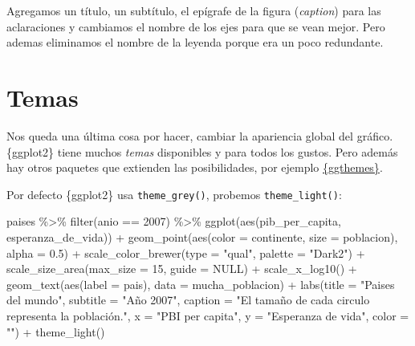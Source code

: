 \documentclass[
  openany]{book}
\newenvironment{Shaded}{\begin{snugshade}}{\end{snugshade}}
\newcommand{\AttributeTok}[1]{\textcolor[rgb]{0.77,0.63,0.00}{#1}}
\newcommand{\ConstantTok}[1]{\textcolor[rgb]{0.00,0.00,0.00}{#1}}
\newcommand{\DecValTok}[1]{\textcolor[rgb]{0.00,0.00,0.81}{#1}}
\newcommand{\FloatTok}[1]{\textcolor[rgb]{0.00,0.00,0.81}{#1}}
\newcommand{\FunctionTok}[1]{\textcolor[rgb]{0.00,0.00,0.00}{#1}}
\newcommand{\NormalTok}[1]{#1}
\newcommand{\SpecialCharTok}[1]{\textcolor[rgb]{0.00,0.00,0.00}{#1}}
\newcommand{\StringTok}[1]{\textcolor[rgb]{0.31,0.60,0.02}{#1}}
\begin{document}
Agregamos un título, un subtítulo, el epígrafe de la figura (\emph{caption}) para las aclaraciones y cambiamos el nombre de los ejes para que se vean mejor.
Pero ademas eliminamos el nombre de la leyenda porque era un poco redundante.

\hypertarget{temas}{%
\section{Temas}\label{temas}}

Nos queda una última cosa por hacer, cambiar la apariencia global del gráfico.
\{ggplot2\} tiene muchos \emph{temas} disponibles y para todos los gustos.
Pero además hay otros paquetes que extienden las posibilidades, por ejemplo \href{https://github.com/jrnold/ggthemes}{\{ggthemes\}}.

Por defecto \{ggplot2\} usa \texttt{theme\_grey()}, probemos \texttt{theme\_light()}:

\begin{Shaded}
\begin{Highlighting}[]
\NormalTok{paises }\SpecialCharTok{\%\textgreater{}\%} 
  \FunctionTok{filter}\NormalTok{(anio }\SpecialCharTok{==} \DecValTok{2007}\NormalTok{) }\SpecialCharTok{\%\textgreater{}\%} 
  \FunctionTok{ggplot}\NormalTok{(}\FunctionTok{aes}\NormalTok{(pib\_per\_capita, esperanza\_de\_vida)) }\SpecialCharTok{+}
  \FunctionTok{geom\_point}\NormalTok{(}\FunctionTok{aes}\NormalTok{(}\AttributeTok{color =}\NormalTok{ continente, }\AttributeTok{size =}\NormalTok{ poblacion), }\AttributeTok{alpha =} \FloatTok{0.5}\NormalTok{) }\SpecialCharTok{+}
  \FunctionTok{scale\_color\_brewer}\NormalTok{(}\AttributeTok{type =} \StringTok{"qual"}\NormalTok{, }\AttributeTok{palette =} \StringTok{"Dark2"}\NormalTok{) }\SpecialCharTok{+}
  \FunctionTok{scale\_size\_area}\NormalTok{(}\AttributeTok{max\_size =} \DecValTok{15}\NormalTok{, }\AttributeTok{guide =} \ConstantTok{NULL}\NormalTok{) }\SpecialCharTok{+}
  \FunctionTok{scale\_x\_log10}\NormalTok{() }\SpecialCharTok{+}
  \FunctionTok{geom\_text}\NormalTok{(}\FunctionTok{aes}\NormalTok{(}\AttributeTok{label =}\NormalTok{ pais), }\AttributeTok{data =}\NormalTok{ mucha\_poblacion) }\SpecialCharTok{+}
  \FunctionTok{labs}\NormalTok{(}\AttributeTok{title =} \StringTok{"Paises del mundo"}\NormalTok{,}
       \AttributeTok{subtitle =} \StringTok{"Año 2007"}\NormalTok{,}
       \AttributeTok{caption =} \StringTok{"El tamaño de cada circulo representa la población."}\NormalTok{,}
       \AttributeTok{x =} \StringTok{"PBI per capita"}\NormalTok{,}
       \AttributeTok{y =} \StringTok{"Esperanza de vida"}\NormalTok{,}
       \AttributeTok{color =} \StringTok{""}\NormalTok{) }\SpecialCharTok{+}
  \FunctionTok{theme\_light}\NormalTok{()}
\end{Highlighting}
\end{Shaded}
\end{document}
